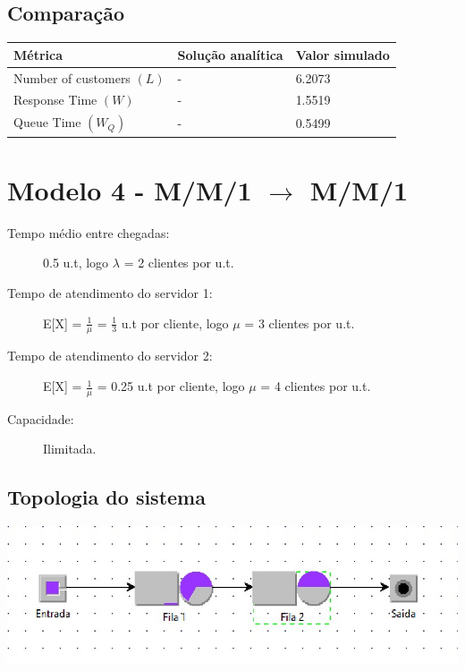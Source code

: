 \documentclass[12pt,a4paper]{article}
\begin{document}
\subsection{Comparação}

\begin{table}[h]
	\centering
	\begin{tabular}{|l|l|l|} 
		\hline
		\textbf{Métrica} & \textbf{Solução analítica} & \textbf{Valor simulado} \\ 
		\hline
		Number of customers \((L)\) & - & 6.2073 \\
		\hline
		Response Time \((W)\) & - & 1.5519 \\
		\hline
		Queue Time \((W_{Q})\) & - & 0.5499 \\
		\hline
	\end{tabular}
\end{table}

\newpage
\section{Modelo 4 - M/M/1 $\rightarrow$ M/M/1}

\begin{description}
	\item[Tempo médio entre chegadas:] 0.5 u.t, logo $\lambda$ = 2 clientes por u.t.
	\item[Tempo de atendimento do servidor 1:] E[X] = $\frac{1}{\mu}$ = $\frac{1}{3}$ u.t por cliente, logo $\mu$ = 3 clientes por u.t.
	\item[Tempo de atendimento do servidor 2:] E[X] = $\frac{1}{\mu}$ = 0.25 u.t por cliente, logo $\mu$ = 4 clientes por u.t.
	\item[Capacidade:] Ilimitada.
\end{description}

\subsection{Topologia do sistema}
\includegraphics[width=\linewidth]{topologias/m4.jpg}
\end{document}
